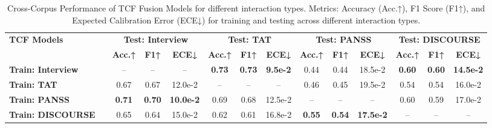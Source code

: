 \documentclass[9pt,a4paper]{rho-class/rho}
\begin{document}
\begin{table*}[t]
\centering
{}
\begin{tabularx}{\textwidth}{lX|ccc|ccc|ccc|ccc}
\toprule
\textbf{TCF Models} & & \multicolumn{3}{c}{\textbf{Test: Interview}} & \multicolumn{3}{c}{\textbf{Test: TAT}} & \multicolumn{3}{c}{\textbf{Test: PANSS}} & \multicolumn{3}{c}{\textbf{Test: DISCOURSE}} \\
                            & & \textbf{Acc.↑} & \textbf{F1↑} & \textbf{ECE↓} & \textbf{Acc.↑} & \textbf{F1↑} & \textbf{ECE↓} & \textbf{Acc.↑} & \textbf{F1↑} & \textbf{ECE↓} & \textbf{Acc.↑} & \textbf{F1↑} & \textbf{ECE↓} \\
\midrule
\textbf{Train: Interview} & & -- & -- & -- & \textbf{0.73} & \textbf{0.73} & \textbf{9.5e-2} & 0.44 & 0.44 & 18.5e-2 & \textbf{0.60} & \textbf{0.60} & \textbf{14.5e-2} \\
\textbf{Train: TAT} & & 0.67 & 0.67 & 12.0e-2 & -- & -- & -- & 0.46 & 0.45 & 19.5e-2 & 0.54 & 0.54 & 16.0e-2 \\
\textbf{Train: PANSS} & & \textbf{0.71} & \textbf{0.70} & \textbf{10.0e-2} & 0.69 & 0.68 & 12.5e-2 & -- & -- & -- & 0.60 & 0.59 & 17.0e-2 \\
\textbf{Train: DISCOURSE} & & 0.65 & 0.64 & 15.0e-2 & 0.62 & 0.61 & 16.8e-2 & \textbf{0.55} & \textbf{0.54} & \textbf{17.5e-2} & -- & -- & -- \\
\bottomrule
\end{tabularx}
\caption{Cross-Corpus Performance of TCF Fusion Models for different interaction types. Metrics: Accuracy (Acc.↑), F1 Score (F1↑), and Expected Calibration Error (ECE↓) for training and testing across different interaction types.}
\end{table*}
\end{document}
